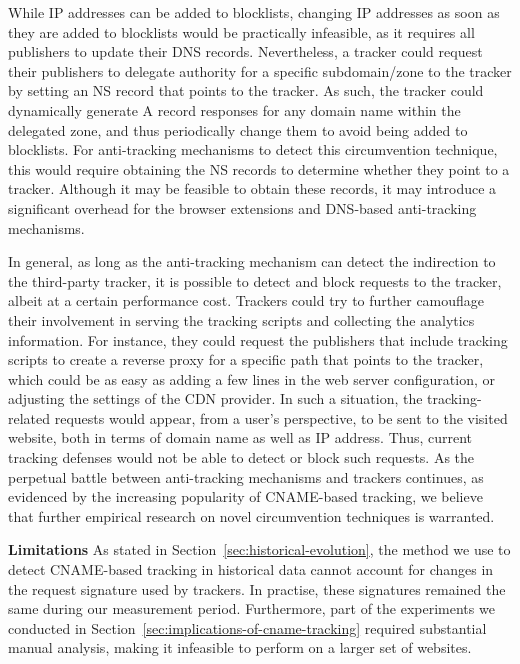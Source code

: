 While IP addresses can be added to blocklists, changing IP addresses as soon as they are added to blocklists would be practically infeasible, as it requires all publishers to update their DNS records.
Nevertheless, a tracker could request their publishers to delegate authority for a specific subdomain/zone to the tracker by setting an NS record that points to the tracker.
As such, the tracker could dynamically generate A record responses for any domain name within the delegated zone, and thus periodically change them to avoid being added to blocklists.
For anti-tracking mechanisms to detect this circumvention technique, this would require obtaining the NS records to determine whether they point to a tracker.
Although it may be feasible to obtain these records, it may introduce a significant overhead for the browser extensions and DNS-based anti-tracking mechanisms.

In general, as long as the anti-tracking mechanism can detect the indirection to the third-party tracker, it is possible to detect and block requests to the tracker, albeit at a certain performance cost.
Trackers could try to further camouflage their involvement in serving the tracking scripts and collecting the analytics information.
For instance, they could request the publishers that include tracking scripts to create a reverse proxy for a specific path that points to the tracker, which could be as easy as adding a few lines in the web server configuration, or adjusting the settings of the CDN provider.
In such a situation, the tracking-related requests would appear, from a user's perspective, to be sent to the visited website, both in terms of domain name as well as IP address.
Thus, current tracking defenses would not be able to detect or block such requests.
As the perpetual battle between anti-tracking mechanisms and trackers continues, as evidenced by the increasing popularity of CNAME-based tracking, we believe that further empirical research on novel circumvention techniques is warranted.

\textbf{Limitations}
As stated in Section~\ref{sec:historical-evolution}, the method we use to detect CNAME-based tracking in historical data cannot account for changes in the request signature used by trackers. In practise, these signatures remained the same during our measurement period. Furthermore, part of the experiments we conducted in Section~\ref{sec:implications-of-cname-tracking} required substantial manual analysis, making it infeasible to perform on a larger set of websites. 
